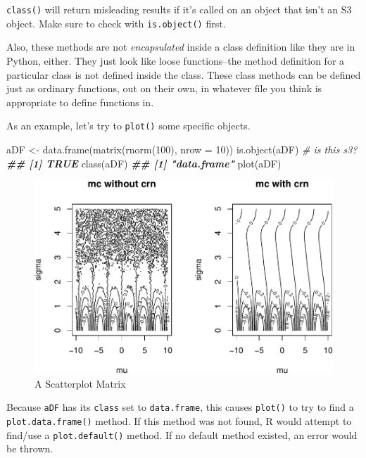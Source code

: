 \documentclass[
  12pt,
  krantz2]{krantz}
\makeatletter
\newenvironment{Shaded}{\begin{snugshade}}{\end{snugshade}}
\newcommand{\AttributeTok}[1]{\textcolor[rgb]{0.61,0.61,0.61}{#1}}
\newcommand{\CommentTok}[1]{\textcolor[rgb]{0.37,0.37,0.37}{\textit{#1}}}
\newcommand{\DecValTok}[1]{\textcolor[rgb]{0.06,0.06,0.06}{#1}}
\newcommand{\DocumentationTok}[1]{\textcolor[rgb]{0.37,0.37,0.37}{\textbf{\textit{#1}}}}
\newcommand{\FunctionTok}[1]{\textcolor[rgb]{0,0,0}{#1}}
\newcommand{\NormalTok}[1]{#1}
\newcommand{\OtherTok}[1]{\textcolor[rgb]{0.37,0.37,0.37}{#1}}
\newenvironment{kframe}{%
\medskip{}
\setlength{\fboxsep}{.8em}
 \def\at@end@of@kframe{}%
 \ifinner\ifhmode%
  \def\at@end@of@kframe{\end{minipage}}%
  \begin{minipage}{\columnwidth}%
 \fi\fi%
 \def\FrameCommand##1{\hskip\@totalleftmargin \hskip-\fboxsep
 \colorbox{shadecolor}{##1}\hskip-\fboxsep
     \hskip-\linewidth \hskip-\@totalleftmargin \hskip\columnwidth}%
 \MakeFramed {\advance\hsize-\width
   \@totalleftmargin\z@ \linewidth\hsize
   \@setminipage}}%
 {\par\unskip\endMakeFramed%
 \at@end@of@kframe}
\renewenvironment{Shaded}{\begin{kframe}}{\end{kframe}}
\newenvironment{rmd-caution}{\begin{lrbox}{\rmdbox}
  \minipage[c]{\dimexpr \textwidth-2\fboxrule-\wd\excl-\columnsep}
    \vspace*{\columnsep}}%
{\vspace*{\columnsep}\endminipage\end{lrbox}%
  {\par\color{yellow}\fboxsep=0pt
    \fbox{\usebox\excl\usebox\rmdbox\hspace{\columnsep}}\par}}
\makeatother
\begin{document}
\begin{rmd-caution}
\texttt{class()} will return misleading results if it's called on an object that isn't an S3 object. Make sure to check with \texttt{is.object()} first.

\end{rmd-caution}

Also, these methods are not \emph{encapsulated} inside a class definition like they are in Python, either. They just look like loose functions--the method definition for a particular class is not defined inside the class. These class methods can be defined just as ordinary functions, out on their own, in whatever file you think is appropriate to define functions in.

As an example, let's try to \texttt{plot()} some specific objects.

\begin{Shaded}
\begin{Highlighting}[]
\NormalTok{aDF }\OtherTok{\textless{}{-}} \FunctionTok{data.frame}\NormalTok{(}\FunctionTok{matrix}\NormalTok{(}\FunctionTok{rnorm}\NormalTok{(}\DecValTok{100}\NormalTok{), }\AttributeTok{nrow =} \DecValTok{10}\NormalTok{))}
\FunctionTok{is.object}\NormalTok{(aDF) }\CommentTok{\# is this s3?}
\DocumentationTok{\#\# [1] TRUE}
\FunctionTok{class}\NormalTok{(aDF)}
\DocumentationTok{\#\# [1] "data.frame"}
\FunctionTok{plot}\NormalTok{(aDF)}
\end{Highlighting}
\end{Shaded}

\begin{figure}

{\centering \includegraphics[width=0.5\linewidth]{r_and_python_book_files/figure-latex/unnamed-chunk-244-1} 

}

\caption{A Scatterplot Matrix}\label{fig:unnamed-chunk-244}
\end{figure}

Because \texttt{aDF} has its \texttt{class} set to \texttt{data.frame}, this causes \texttt{plot()} to try to find a \texttt{plot.data.frame()} method. If this method was not found, R would attempt to find/use a \texttt{plot.default()} method. If no default method existed, an error would be thrown.
\end{document}
